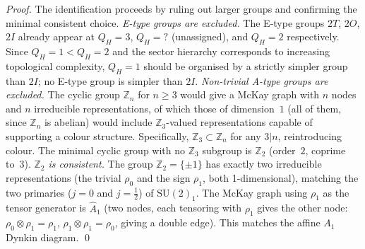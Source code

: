 \documentclass[11pt,a4paper]{article}
\theoremstyle{definition}\newtheorem{definition}[theorem]{Definition}
\theoremstyle{remark}
\newcommand{\SU}{\mathrm{SU}}
\newcommand{\twoI}{2I}
\newcommand{\twoT}{2T}
\newcommand{\twoO}{2O}
\newcommand{\QH}{Q_H}
\newcommand{\Ztwo}{\mathbb{Z}_2}
\begin{document}
\begin{proof}
The identification proceeds by ruling out larger groups and confirming
the minimal consistent choice.
\emph{E-type groups are excluded.} The E-type groups $\twoT$, $\twoO$,
$\twoI$ already appear at $\QH=3$, $\QH=?$ (unassigned), and $\QH=2$
respectively. Since $\QH=1<\QH=2$ and the sector hierarchy
corresponds to increasing topological complexity, $\QH=1$ should be
organised by a strictly simpler group than $\twoI$; no E-type group is
simpler than $\twoI$.
\emph{Non-trivial A-type groups are excluded.} The cyclic group
$\mathbb{Z}_n$ for $n\geq3$ would give a McKay graph with $n$ nodes
and $n$ irreducible representations, of which those of dimension~$1$
(all of them, since $\mathbb{Z}_n$ is abelian) would include
$\mathbb{Z}_3$-valued representations capable of supporting a colour
structure. Specifically, $\mathbb{Z}_3\subset\mathbb{Z}_n$ for any
$3|n$, reintroducing colour. The minimal cyclic group with no
$\mathbb{Z}_3$ subgroup is $\Ztwo$ (order~$2$, coprime to~$3$).
\emph{$\Ztwo$ is consistent.} The group $\Ztwo=\{\pm1\}$ has exactly
two irreducible representations (the trivial $\rho_0$ and the sign
$\rho_1$, both 1-dimensional), matching the two primaries
($j=0$ and $j=\tfrac12$) of $\SU(2)_1$. The McKay graph using $\rho_1$
as the tensor generator is $\widehat{A}_1$ (two nodes, each tensoring
with $\rho_1$ gives the other node: $\rho_0\otimes\rho_1=\rho_1$,
$\rho_1\otimes\rho_1=\rho_0$, giving a double edge). This matches
the affine $A_1$ Dynkin diagram.
\qed
\end{proof}
\end{document}

